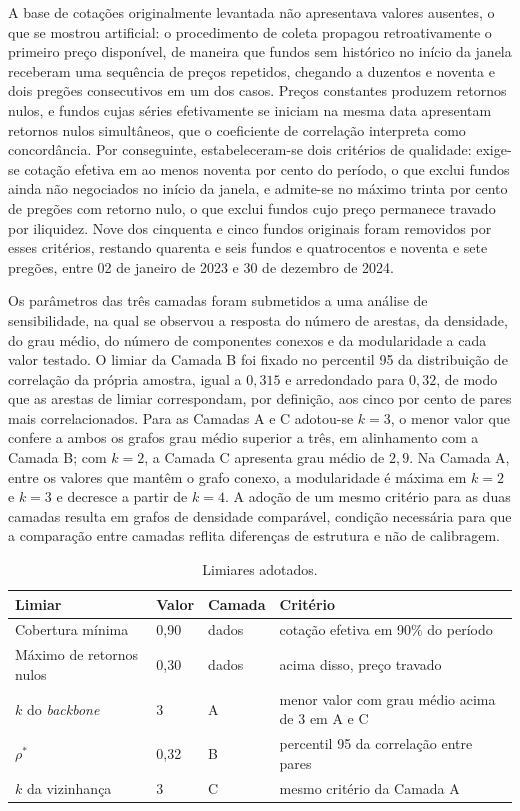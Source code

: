 A base de cotações originalmente levantada não apresentava valores ausentes, o
que se mostrou artificial: o procedimento de coleta propagou retroativamente o
primeiro preço disponível, de maneira que fundos sem histórico no início da
janela receberam uma sequência de preços repetidos, chegando a duzentos e
noventa e dois pregões consecutivos em um dos casos. Preços constantes
produzem retornos nulos, e fundos cujas séries efetivamente se iniciam na
mesma data apresentam retornos nulos simultâneos, que o coeficiente de
correlação interpreta como concordância. Por conseguinte, estabeleceram-se
dois critérios de qualidade: exige-se cotação efetiva em ao menos noventa por
cento do período, o que exclui fundos ainda não negociados no início da
janela, e admite-se no máximo trinta por cento de pregões com retorno nulo, o
que exclui fundos cujo preço permanece travado por iliquidez. Nove dos
cinquenta e cinco fundos originais foram removidos por esses critérios,
restando quarenta e seis fundos e quatrocentos e noventa e sete pregões, entre
02 de janeiro de 2023 e 30 de dezembro de 2024.

Os parâmetros das três camadas foram submetidos a uma análise de
sensibilidade, na qual se observou a resposta do número de arestas, da
densidade, do grau médio, do número de componentes conexos e da modularidade a
cada valor testado. O limiar da Camada B foi fixado no percentil 95 da
distribuição de correlação da própria amostra, igual a $0{,}315$ e arredondado
para $0{,}32$, de modo que as arestas de limiar correspondam, por definição,
aos cinco por cento de pares mais correlacionados. Para as Camadas A e C
adotou-se $k = 3$, o menor valor que confere a ambos os grafos grau médio
superior a três, em alinhamento com a Camada B; com $k = 2$, a Camada C
apresenta grau médio de $2{,}9$. Na Camada A, entre os valores que mantêm o
grafo conexo, a modularidade é máxima em $k = 2$ e $k = 3$ e decresce a partir
de $k = 4$. A adoção de um mesmo critério para as duas camadas resulta em
grafos de densidade comparável, condição necessária para que a comparação
entre camadas reflita diferenças de estrutura e não de calibragem.

\begin{table}[htbp]
\centering
\caption{Limiares adotados.}
\label{tab:limiares}
\begin{tabular}{llll}
\toprule
\textbf{Limiar} & \textbf{Valor} & \textbf{Camada} & \textbf{Critério} \\
\midrule
Cobertura mínima        & 0,90 & dados & cotação efetiva em 90\% do período \\
Máximo de retornos nulos & 0,30 & dados & acima disso, preço travado \\
$k$ do \textit{backbone} & 3    & A     & menor valor com grau médio acima de 3 em A e C \\
$\rho^{*}$              & 0,32 & B     & percentil 95 da correlação entre pares \\
$k$ da vizinhança       & 3    & C     & mesmo critério da Camada A \\
\bottomrule
\end{tabular}
\end{table}

